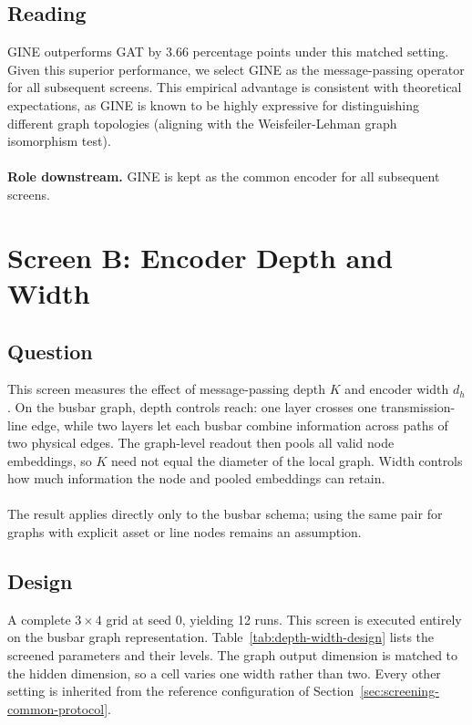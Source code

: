 \subsection*{Reading}

GINE outperforms GAT by 3.66 percentage points under this matched
setting. Given this superior performance, we select GINE as the message-passing
operator for all subsequent screens. This empirical advantage is consistent with
theoretical expectations, as GINE is known to be highly expressive for distinguishing
different graph topologies (aligning with the Weisfeiler-Lehman graph isomorphism test).
\\
\\
\noindent\textbf{Role downstream.} GINE is kept as the common encoder for all subsequent screens.

\section{Screen B: Encoder Depth and Width}
\label{sec:screen-eepth-width}

\subsection*{Question}

This screen measures the effect of message-passing depth $K$ and encoder width $d_h$. On the busbar graph, depth
controls reach: one layer crosses one transmission-line edge, while two layers
let each busbar combine information across paths of two physical edges. The
graph-level readout then pools all valid node embeddings, so $K$ need not equal
the diameter of the local graph. Width controls how much information the node
and pooled embeddings can retain.
\\
\\
The result applies directly only to the busbar schema; using the same pair for
graphs with explicit asset or line nodes remains an assumption.

\subsection*{Design}

A complete $3\times4$ grid at seed 0, yielding 12 runs. This screen is executed entirely on the busbar graph representation.
Table~\ref{tab:depth-width-design} lists the screened parameters and their
levels. The graph output dimension is matched to the hidden dimension, so a
cell varies one width rather than two. Every other setting is inherited from
the reference configuration of
Section~\ref{sec:screening-common-protocol}.


